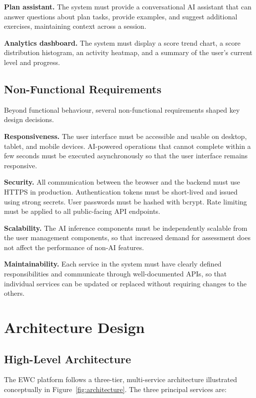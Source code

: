 \documentclass[12pt, a4paper]{report}
\begin{document}
\textbf{Plan assistant.} The system must provide a conversational AI assistant that can answer questions about plan tasks, provide examples, and suggest additional exercises, maintaining context across a session.

\textbf{Analytics dashboard.} The system must display a score trend chart, a score distribution histogram, an activity heatmap, and a summary of the user's current level and progress.

\subsection{Non-Functional Requirements}

Beyond functional behaviour, several non-functional requirements shaped key design decisions.

\textbf{Responsiveness.} The user interface must be accessible and usable on desktop, tablet, and mobile devices. AI-powered operations that cannot complete within a few seconds must be executed asynchronously so that the user interface remains responsive.

\textbf{Security.} All communication between the browser and the backend must use HTTPS in production. Authentication tokens must be short-lived and issued using strong secrets. User passwords must be hashed with bcrypt. Rate limiting must be applied to all public-facing API endpoints.

\textbf{Scalability.} The AI inference components must be independently scalable from the user management components, so that increased demand for assessment does not affect the performance of non-AI features.

\textbf{Maintainability.} Each service in the system must have clearly defined responsibilities and communicate through well-documented APIs, so that individual services can be updated or replaced without requiring changes to the others.

\section{Architecture Design}

\subsection{High-Level Architecture}

The EWC platform follows a three-tier, multi-service architecture illustrated conceptually in Figure~\ref{fig:architecture}. The three principal services are:
\end{document}
